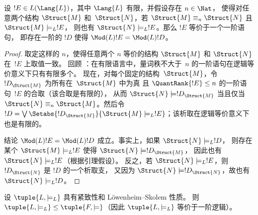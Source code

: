 \documentclass[../../../include/open-logic-section]{subfiles}
\begin{document}


\begin{lem}
设 $!E \in L(\Lang{L})$，其中 $\Lang{L}$ 有限，并假设存在 $n \in \Nat$，
使得对任意两个结构 $\Struct{M}$ 和~$\Struct{N}$，若 $\Struct{M} \equiv_n
\Struct{N}$ 且 $\Struct{M} \models_L !E$，
则也有 $\Struct{N} \models_L !E$。那么 $!E$ 等价于一个一阶语句，
即存在一阶的 $!D$ 使得 $\Mod(L){!E} = \Mod(L){!D}$。
\end{lem}

\begin{proof}
取定这样的 $n$，使得任意两个 $n$ 等价的结构 $\Struct{M}$ 和 $\Struct{N}$ 在~$!E$ 上取值一致。
回顾 ：在有限语言中，量词秩不大于~$n$ 的一阶语句在逻辑等价意义下只有有限多个。
现在，对每个固定的结构~$\Struct{M}$，令 $!D_{\Struct{M}}$ 为所有在~$\Struct{M}$ 中为真
且 $\QuantRank{!E} \le n$ 的一阶语句~$!E$ 的合取（该合取是有限的），
从而 $\Struct{N} \models !D_{\Struct{M}}$ 当且仅当 $\Struct{N}
\equiv_n \Struct{M}$。然后令 $!D = \textstyle\bigvee
\Setabs{!D_{\Struct{M}}}{\Struct{M} \models_L !E}$；该析取在逻辑等价意义下也是有限的。

结论 $\Mod(L){!E} = \Mod(L){!D}$ 成立。事实上，如果 $\Struct{N} \models_L !D$，
则存在某个 $\Struct{M} \models_L !E$ 使得 $\Struct{N} \models !D_{\Struct{M}}$，
因此也有 $\Struct{N} \models_L !E$（根据引理假设）。
反之，若 $\Struct{N} \models_L !E$，则 $!D_{\Struct{N}}$ 是 $!D$ 的一个析取支，
又因为 $\Struct{N}
\models !D_{\Struct{N}}$，故也有 $\Struct{N} \models_L !D$。
\end{proof}

\begin{thm}[Lindström 定理]
   设 $\tuple{L, \models_L}$ 具有紧致性和 Löwenheim--Skolem 性质。
  则 $\tuple{L, \models_L} \le \tuple{F, \models}$（因此 $\tuple{L, \models_L}$ 等价于一阶逻辑）。
\end{thm}
\end{document}
